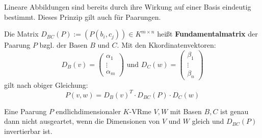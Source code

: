 \documentclass[parskip,a4paper,twoside,DIV15,BCOR12mm]{scrbook}
\begin{document}
\begin{remind}
Lineare Abbildungen sind bereits durch ihre Wirkung auf einer Basis eindeutig
bestimmt. Dieses Prinzip gilt auch für Paarungen.
\end{remind}

\begin{comment}
\index{bilinear!Fortsetzung}\index{Fortsetzung!bilineare}
Seien $V,W$ $K$-VRme mit jeweiliger Basis $B:=\{b_1,\ldots,b_m\}\subseteq V,
C:=\{c_1,\ldots,c_n\}\subseteq W$, so ist eine Paarung $P$ auf $V\times W$
Bereits durch ihre Einschränkung auf $B\times C$ festgelegt.\\
Für $v:=\sum_{i=1}^m \alpha_i b_i,w:=\sum_{j=1}^n \beta_j c_j$ gilt:
\[P(v,w)=\sum_{i=1}^m\sum_{j=1}^n \alpha_i\beta_j\cdot P(b_i,c_j)\]
Jede Abbildung $P':B\times C\to K$ definiert über diese Gleichung eine Paarung
$P':V\times W\to K$. Diese heißt \textbf{bilineare Fortsetzung}.
\end{comment}

\begin{definition}
Die Matrix $D_{BC}(P):=(P(b_i,c_j))\in K^{m\times n}$ heißt \textbf{Fundamentalmatrix}
der Paarung $P$ bzgl. der Basen $B$ und $C$. Mit den Kkordinatenvektoren:
\[D_B(v)=\begin{pmatrix}\alpha_1\\\vdots\\\alpha_m\end{pmatrix}\text{ und }
D_C(w)=\begin{pmatrix}\beta_1\\\vdots\\\beta_n\end{pmatrix}\]
gilt nach obiger Gleichung:
\[P(v,w)=D_B(v)^T\cdot D_{BC}(P)\cdot D_C(w)\]
\end{definition}

\begin{theo}
Eine Paarung $P$ endlichdimensionaler $K$-VRme $V,W$ mit Basen $B,C$ ist genau dann
nicht ausgeartet, wenn die Dimensionen von $V$ und $W$ gleich und $D_{BC}(P)$ invertierbar
ist.
\end{theo}
\end{document}

